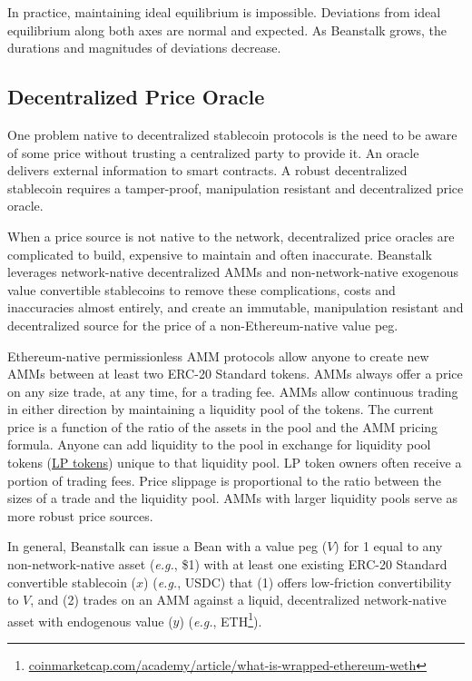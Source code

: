 \documentclass[tikz]{article}
\newcommand{\term}[1]{\textsl{#1}}
\newcommand{\fref}[1]{\footnote{\href{http://#1}{#1}}}
\newcommand{\Bean}{} %
\begin{document}
In practice, maintaining ideal equilibrium is impossible. Deviations from ideal equilibrium along both axes are normal and expected. As Beanstalk grows, the durations and magnitudes of deviations decrease. 

\vspace*{2mm}
\subsection{Decentralized Price Oracle}
\vspace*{2mm}

One problem native to decentralized stablecoin protocols is the need to be aware of some price without trusting a centralized party to provide it. An oracle delivers external information to smart contracts. A robust decentralized stablecoin requires a tamper-proof, manipulation resistant and decentralized price oracle.

When a price source is not native to the network, decentralized price oracles are complicated to build, expensive to maintain and often inaccurate. Beanstalk leverages network-native decentralized AMMs and non-network-native exogenous value convertible stablecoins to remove these complications, costs and inaccuracies almost entirely, and create an immutable, manipulation resistant and decentralized source for the price of a non-Ethereum-native value peg.

\newpage

Ethereum-native permissionless AMM protocols allow anyone to create new AMMs between at least two ERC-20 Standard tokens. AMMs always offer a price on any size trade, at any time, for a trading fee. AMMs allow continuous trading in either direction by maintaining a liquidity pool of the tokens. The current price is a function of the ratio of the assets in the pool and the AMM pricing formula. Anyone can add liquidity to the pool in exchange for liquidity pool tokens (\hyperlink{LP tokens}{LP tokens}) unique to that liquidity pool. LP token owners often receive a portion of trading fees. Price slippage is proportional to the ratio between the sizes of a trade and the liquidity pool. AMMs with larger liquidity pools serve as more robust price sources.

In general, Beanstalk can issue a Bean with a value peg (\hyperlink{ht216}{$V$}) for \Bean1 equal to any non-network-native asset (\term{e.g.}, \$1) with at least one existing ERC-20 Standard convertible stablecoin (\hyperlink{ht223}{$x$}) (\term{e.g.}, USDC) that (1) offers low-friction convertibility to \hyperlink{ht216}{$V$}, and (2) trades on an AMM against a liquid, decentralized network-native asset with endogenous value (\hyperlink{ht227}{$y$}) (\term{e.g.}, ETH\fref{coinmarketcap.com/academy/article/what-is-wrapped-ethereum-weth}). 
\end{document}
